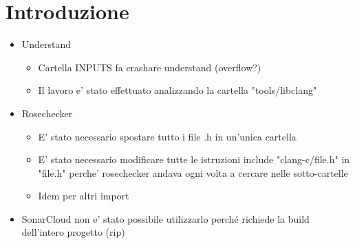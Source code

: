 \chapter{Introduzione}

\begin{itemize}
	\item Understand
		\begin{itemize}
			\item Cartella INPUTS fa crashare understand (overflow?)
			\item Il lavoro e' stato effettuato analizzando la cartella "tools/libclang"
		\end{itemize}
	\item Rosechecker
		\begin{itemize}
			\item E' stato necessario spostare tutto i file .h in un'unica cartella
			\item E' stato necessario modificare tutte le istruzioni include "clang-c/file.h" in "file.h" perche' rosechecker andava ogni volta a cercare nelle sotto-cartelle
			\item Idem per altri import
		\end{itemize}
	\item SonarCloud non e' stato possibile utilizzarlo perché richiede la build dell'intero progetto (rip)
\end{itemize}